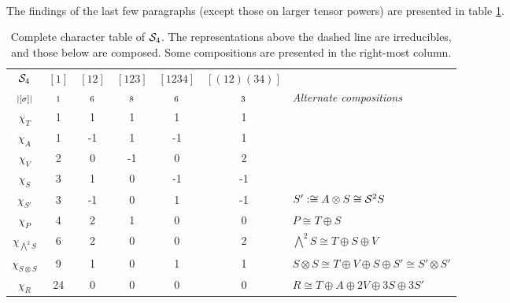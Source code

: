 \begin{example}
	\paragraph{} The findings of the last few paragraphs (except those on larger tensor powers) are presented in table \ref{table:completecharS4}.
	
	\begin{table}[hbt!]
		\centering
		\begin{tabular}{c | c c c c c | l}
			$\mathcal{S}_4$         & $[1]$   & $[12]$  & $[123]$ & $[1234]$ & $[(12)(34)]$ &                                                              \\
			$\scriptstyle|[\sigma]|$    & $\scriptstyle 1$ & $\scriptstyle 6$ & $\scriptstyle 8$ & $\scriptstyle 6$  & $\scriptstyle 3$      & \textit{Alternate compositions}                              \\ \hline
			$\chi_T$       & 1       & 1       & 1       & 1        & 1            &                                                              \\
			$\chi_A$       & 1       & -1      & 1       & -1       & 1            &                                                              \\
			$\chi_V$       & 2       & 0       & -1      & 0        & 2            &                                                              \\
			$\chi_S$       & 3       & 1       & 0       & -1       & -1           &                                                              \\
			$\chi_{S'}$ & 3       & -1      & 0       & 1        & -1           & $S' :\cong A \otimes S \cong \mathcal{S}^2S$                                  \\ \hline\hline
			$\chi_P$       & 4       & 2       & 1       & 0        & 0            & $P \cong T \oplus S$                                         \\
			$\chi_{\bigwedge^2S}$    & 6       & 2       & 0       & 0        & 2            & $\bigwedge^2S \cong T \oplus S \oplus V$                     \\
			$\chi_{S \otimes S}$ & 9       & 1       & 0       & 1        & 1            & $S \otimes S \cong T \oplus V \oplus S \oplus S' \cong S' \otimes S'$ \\
			$\chi_R$       & 24      & 0       & 0       & 0        & 0            & $R \cong T \oplus A \oplus 2V \oplus 3S \oplus 3S'$
		\end{tabular}
		\caption{Complete character table of $\mathcal{S}_4$. The representations above the dashed line are irreducibles, and those below are composed. Some compositions are presented in the right-most column.}
		\label{table:completecharS4}
	\end{table}
\end{example}

